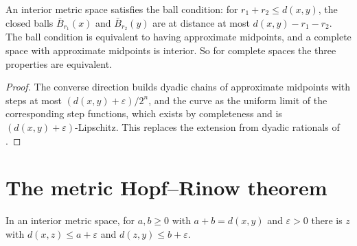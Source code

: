 \begin{theorem}
  \label{thm:ms-midpoints-iff}
  \leanok
  An interior metric space satisfies the ball condition: for $r_1 + r_2 \leq d(x, y)$, the closed
  balls $\bar B_{r_1}(x)$ and $\bar B_{r_2}(y)$ are at distance at most $d(x, y) - r_1 - r_2$. The
  ball condition is equivalent to having approximate midpoints, and a complete space with
  approximate midpoints is interior. So for complete spaces the three properties are equivalent.
\end{theorem}

\begin{proof}
  \leanok
  The converse direction builds dyadic chains of approximate midpoints with steps at most
  $(d(x, y) + \varepsilon)/2^n$, and the curve as the uniform limit of the corresponding step
  functions, which exists by completeness and is $(d(x, y) + \varepsilon)$-Lipschitz. This replaces
  the extension from dyadic rationals of \cite[Lema~8.1.9]{Lar22}.
\end{proof}

\section{The metric Hopf--Rinow theorem}
\label{sec:ms-hopf-rinow}

\begin{lemma}
  \label{lem:ms-intermediate}
  \leanok
  In an interior metric space, for $a, b \geq 0$ with $a + b = d(x, y)$ and $\varepsilon > 0$
  there is $z$ with $d(x, z) \leq a + \varepsilon$ and $d(z, y) \leq b + \varepsilon$.
\end{lemma}

